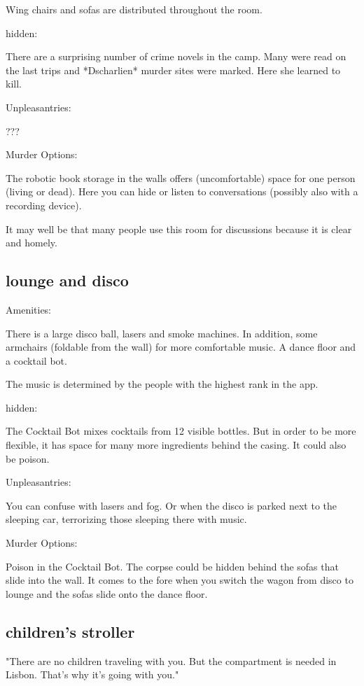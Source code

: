 \documentclass{book}
\begin{document}
Wing chairs and sofas are distributed throughout the room.

hidden:

There are a surprising number of crime novels in the camp. Many were read on the last trips and *Dscharlien* murder sites were marked. Here she learned to kill.

Unpleasantries:

???

Murder Options:

The robotic book storage in the walls offers (uncomfortable) space for one person (living or dead). Here you can hide or listen to conversations (possibly also with a recording device).

It may well be that many people use this room for discussions because it is clear and homely.

\subsection{lounge and disco}


Amenities:

There is a large disco ball, lasers and smoke machines. In addition, some armchairs (foldable from the wall) for more comfortable music. A dance floor and a cocktail bot.

The music is determined by the people with the highest rank in the app.

hidden:

The Cocktail Bot mixes cocktails from 12 visible bottles. But in order to be more flexible, it has space for many more ingredients behind the casing. It could also be poison.


Unpleasantries:

You can confuse with lasers and fog. Or when the disco is parked next to the sleeping car, terrorizing those sleeping there with music.

Murder Options:

Poison in the Cocktail Bot. The corpse could be hidden behind the sofas that slide into the wall.
It comes to the fore when you switch the wagon from disco to lounge and the sofas slide onto the dance floor.

\subsection{children's stroller}


"There are no children traveling with you. But the compartment is needed in Lisbon. That's why it's going with you."
\end{document}
